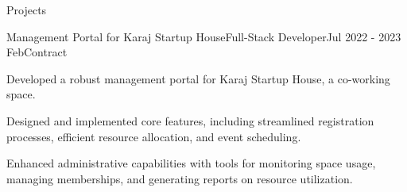 \documentclass[]{kyvernitis-resume}
\begin{document}
\begin{section}{Projects}
\begin{subsection}{Management Portal for Karaj Startup House}{Full-Stack Developer}{Jul 2022 - 2023 Feb}{Contract}{}
		\item Developed a robust management portal for Karaj Startup House, a co-working space.
		\item Designed and implemented core features, including streamlined registration processes, efficient resource allocation, and event scheduling.
		\item Enhanced administrative capabilities with tools for monitoring space usage, managing memberships, and generating reports on resource utilization.    
\end{subsection}


    
\end{section}


\end{document}
